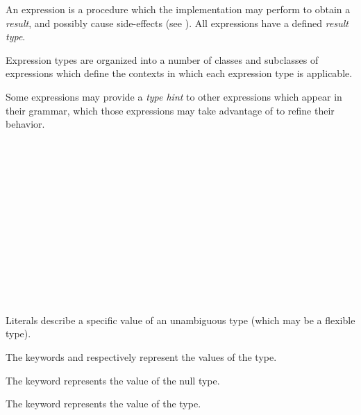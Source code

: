 
\specsubitem
An expression is a procedure which the implementation may perform to obtain a
\textit{result}, and possibly cause side-effects (see
). All expressions have a defined
\textit{result type}.

\specsubitem
Expression types are organized into a number of classes and subclasses of
expressions which define the contexts in which each expression type is
applicable.

\specsubitem
Some expressions may provide a \textit{type hint} to other expressions which
appear in their grammar, which those expressions may take advantage of to
refine their behavior.


\begin{grammar}
 \\
	 \\
	 \\
	 \\
	 \\
	 \\
	 \\
	 \\
	 \\
	 \\
	 \\
	 \\
\end{grammar}

\specsubsubitem
Literals describe a specific value of an unambiguous type (which may be a
flexible type).

\specsubsubitem
The keywords  and  respectively represent
the values of the  type.

\specsubsubitem
The  keyword represents the value of the null type.

\specsubsubitem
The  keyword represents the value of the  type.


